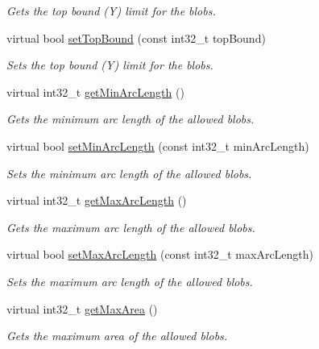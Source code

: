 \begin{DoxyCompactItemize}
\begin{DoxyCompactList}\small\item\em Gets the top bound (Y) limit for the blobs. \end{DoxyCompactList}\item 
virtual bool \hyperlink{classlbpExtract__IDLServer_a50677882bf32262601b91046a2dcdbf2}{set\+Top\+Bound} (const int32\+\_\+t top\+Bound)
\begin{DoxyCompactList}\small\item\em Sets the top bound (Y) limit for the blobs. \end{DoxyCompactList}\item 
virtual int32\+\_\+t \hyperlink{classlbpExtract__IDLServer_ae98976e14296fd7fd3596da8faf862d3}{get\+Min\+Arc\+Length} ()
\begin{DoxyCompactList}\small\item\em Gets the minimum arc length of the allowed blobs. \end{DoxyCompactList}\item 
virtual bool \hyperlink{classlbpExtract__IDLServer_abd1ebed4459c05a4b849f8eebea14127}{set\+Min\+Arc\+Length} (const int32\+\_\+t min\+Arc\+Length)
\begin{DoxyCompactList}\small\item\em Sets the minimum arc length of the allowed blobs. \end{DoxyCompactList}\item 
virtual int32\+\_\+t \hyperlink{classlbpExtract__IDLServer_ae6f220a2b984c7211bd59beca4db0373}{get\+Max\+Arc\+Length} ()
\begin{DoxyCompactList}\small\item\em Gets the maximum arc length of the allowed blobs. \end{DoxyCompactList}\item 
virtual bool \hyperlink{classlbpExtract__IDLServer_abc379ba01952949df03f977c74884ade}{set\+Max\+Arc\+Length} (const int32\+\_\+t max\+Arc\+Length)
\begin{DoxyCompactList}\small\item\em Sets the maximum arc length of the allowed blobs. \end{DoxyCompactList}\item 
virtual int32\+\_\+t \hyperlink{classlbpExtract__IDLServer_a46c4f38052cd2abd334e4e0f0263fab4}{get\+Max\+Area} ()
\begin{DoxyCompactList}\small\item\em Gets the maximum area of the allowed blobs. \end{DoxyCompactList}\item 

\end{DoxyCompactItemize}
